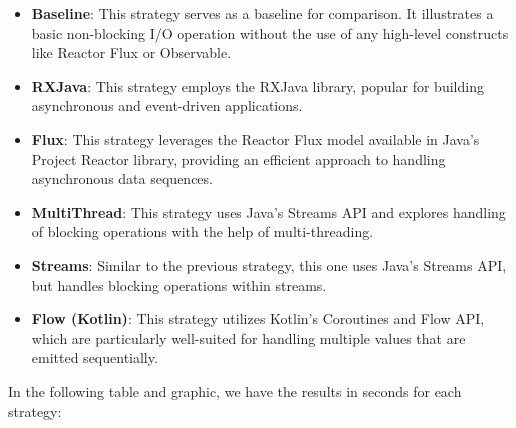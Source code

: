     \begin{itemize}
        \item \textbf{Baseline}: This strategy serves as a baseline for comparison. It illustrates a basic non-blocking I/O operation without the use of any high-level constructs like Reactor Flux or Observable.
        \item \textbf{RXJava}: This strategy employs the RXJava library, popular for building asynchronous and event-driven applications.
        \item \textbf{Flux}: This strategy leverages the Reactor Flux model available in Java's Project Reactor library, providing an efficient approach to handling asynchronous data sequences.
        \item \textbf{MultiThread}: This strategy uses Java's Streams API and explores handling of blocking operations with the help of multi-threading.
        \item \textbf{Streams}: Similar to the previous strategy, this one uses Java's Streams API, but handles blocking operations within streams.
        \item \textbf{Flow (Kotlin)}: This strategy utilizes Kotlin's Coroutines and Flow API, which are particularly well-suited for handling multiple values that are emitted sequentially.
    \end{itemize}

    In the following table and graphic, we have the results in seconds for each strategy:

        
